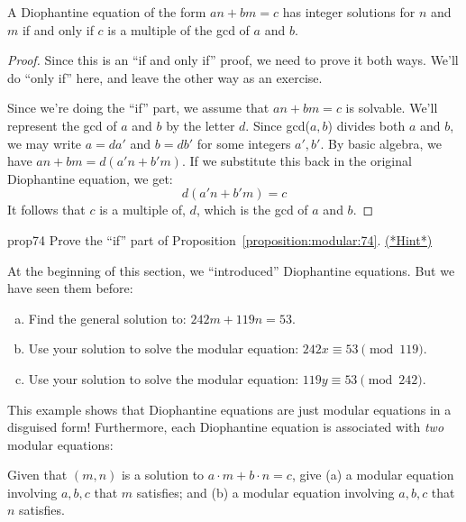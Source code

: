 \begin{prop}{74}
A Diophantine equation of the form $an + bm = c$  has integer solutions for $n$ and $m$  if and only if $c$ is a multiple of the gcd of $a$ and $b$.
\end{prop}
\begin{proof}{}
Since this is an ``if and only if'' proof, we need to prove it both ways.  We'll do ``only if''  here, and leave the other way as an exercise.

Since we're doing the ``if'' part, we assume that $an + bm = c$ is solvable.
We'll represent the gcd of $a$ and $b$ by the letter $d$. Since gcd($a,b$) divides both $a$ and $b$, we may write $a = da'$ and $b = db'$ for some integers $a',b'$.  By basic algebra, we have $an+bm =d(a'n +b'm)$. If we substitute this back in the original Diophantine equation, we get:
\[d(a'n +b'm)=c\]
It follows that $c$ is a multiple of, $d$, which is the gcd of $a$ and $b$.
\end{proof}

\begin {exercise}{prop74}
Prove the ``if'' part of Proposition~\ref{proposition:modular:74}. 
\hyperref[sec:modular_arithmetic:hints]{(*Hint*)}
\end{exercise}


At the beginning of this section, we ``introduced'' Diophantine equations.  But we have seen them before:

\begin{exercise}{}
\begin{enumerate}[(a)]
\item
Find the general solution to: $242m + 119n = 53$.
\item 
Use your solution to solve the modular equation: $242x \equiv 53 \pmod{119}$.
\item
Use your solution to solve the modular equation:  $119y \equiv 53 \pmod{242}$.
\end{enumerate}
\end{exercise}
This example shows that Diophantine equations are just modular equations in a disguised form!  Furthermore, each Diophantine equation is associated with \emph{two} modular equations:

\begin{exercise}{}
Given that $(m,n)$ is a solution to $a \cdot m + b \cdot n  = c$, give (a) a modular equation involving $a,b,c$ that $m$ satisfies; and (b) a modular equation involving $a,b,c$ that $n$ satisfies.
\end{exercise}



